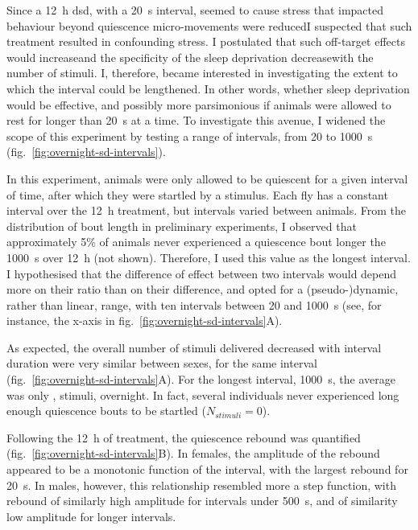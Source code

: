 Since a 12~h \gls{dsd}, with a 20~s interval, seemed to cause stress that impacted behaviour beyond quiescence \emd{}\eg{} micro-movements were reduced\emd{}I suspected that such treatment resulted in confounding stress.
I postulated that such off-target effects would increase\emd{}and the specificity of the sleep deprivation decrease\emd{}with the number of stimuli.
I, therefore, became interested in investigating the extent to which the interval could be lengthened.
In other words, whether sleep deprivation would be effective, and possibly more parsimonious if animals were allowed to rest for longer than 20~s at a time.
To investigate this avenue, I widened the scope of this experiment by testing a range of intervals, from 20 to 1000~s (fig.~\ref{fig:overnight-sd-intervals}).

In this experiment, animals were only allowed to be quiescent for a given interval of time, after which they were startled by a stimulus. 
Each fly has a constant interval over the 12~h treatment, but intervals varied between animals.
From the distribution of bout length in preliminary experiments, I observed that approximately 5\% of animals never experienced a quiescence bout longer the 1000~s over 12~h (not shown).
Therefore, I used this value as the longest interval. 
I hypothesised that the difference of effect between two intervals would depend more on their ratio than on their difference, and opted for a (pseudo-)dynamic, rather than linear, range, with ten intervals between 20 and 1000~s (see, for instance, the x-axis in fig.~\ref{fig:overnight-sd-intervals}A).



As expected, the overall number of stimuli delivered decreased with interval duration were very similar between sexes, for the same interval  (fig.~\ref{fig:overnight-sd-intervals}A).
For the longest interval, 1000~s, the average was only , stimuli, overnight.
In fact, several individuals never experienced long enough quiescence bouts to be startled ($N_{stimuli} = 0$).

Following the 12~h of treatment, the quiescence rebound was quantified (fig.~\ref{fig:overnight-sd-intervals}B).
In females, the amplitude of the rebound appeared to be a monotonic function of the interval, with the largest rebound for 20~s.
In males, however, this relationship resembled more a step function, with rebound of similarly high amplitude for intervals under 500~s, 
and of similarity low amplitude for longer intervals.

